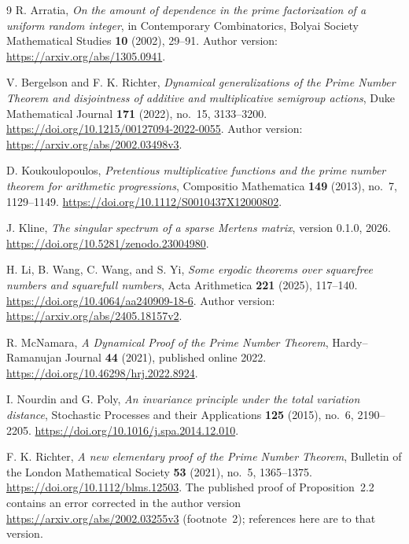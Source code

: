 \documentclass[11pt]{article}
\theoremstyle{remark}\newtheorem{remark}[theorem]{Remark}
\begin{document}
\begin{thebibliography}{9}
R. Arratia, \emph{On the amount of dependence in the prime factorization of a uniform random integer}, in Contemporary Combinatorics, Bolyai Society Mathematical Studies \textbf{10} (2002), 29--91. Author version: \url{https://arxiv.org/abs/1305.0941}.

V. Bergelson and F. K. Richter, \emph{Dynamical generalizations of the Prime Number Theorem and disjointness of additive and multiplicative semigroup actions}, Duke Mathematical Journal \textbf{171} (2022), no.~15, 3133--3200. \url{https://doi.org/10.1215/00127094-2022-0055}. Author version: \url{https://arxiv.org/abs/2002.03498v3}.

D. Koukoulopoulos, \emph{Pretentious multiplicative functions and the prime number theorem for arithmetic progressions}, Compositio Mathematica \textbf{149} (2013), no.~7, 1129--1149. \url{https://doi.org/10.1112/S0010437X12000802}.

J. Kline, \emph{The singular spectrum of a sparse Mertens matrix}, version 0.1.0, 2026. \url{https://doi.org/10.5281/zenodo.23004980}.

H. Li, B. Wang, C. Wang, and S. Yi, \emph{Some ergodic theorems over squarefree numbers and squarefull numbers}, Acta Arithmetica \textbf{221} (2025), 117--140. \url{https://doi.org/10.4064/aa240909-18-6}. Author version: \url{https://arxiv.org/abs/2405.18157v2}.

R. McNamara, \emph{A Dynamical Proof of the Prime Number Theorem}, Hardy--Ramanujan Journal \textbf{44} (2021), published online 2022. \url{https://doi.org/10.46298/hrj.2022.8924}.

I. Nourdin and G. Poly, \emph{An invariance principle under the total variation distance}, Stochastic Processes and their Applications \textbf{125} (2015), no.~6, 2190--2205. \url{https://doi.org/10.1016/j.spa.2014.12.010}.

F. K. Richter, \emph{A new elementary proof of the Prime Number Theorem}, Bulletin of the London Mathematical Society \textbf{53} (2021), no.~5, 1365--1375. \url{https://doi.org/10.1112/blms.12503}. The published proof of Proposition~2.2 contains an error corrected in the author version \url{https://arxiv.org/abs/2002.03255v3} (footnote~2); references here are to that version.
\end{thebibliography}
\end{document}
